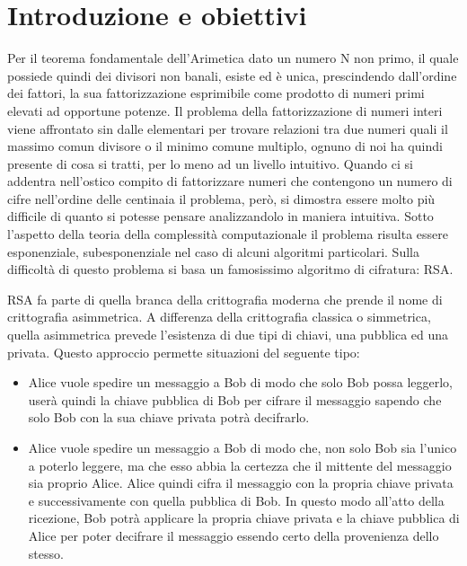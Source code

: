 \section{Introduzione e obiettivi}
\label{sec:introduzione}





Per il teorema fondamentale dell'Arimetica dato un numero N non primo, il quale possiede quindi dei divisori non banali, esiste ed è unica, prescindendo dall'ordine dei fattori, la sua fattorizzazione esprimibile come prodotto di numeri primi elevati ad opportune potenze.
Il problema della fattorizzazione di numeri interi viene affrontato sin dalle elementari per trovare relazioni tra due numeri quali il massimo comun divisore o il minimo comune multiplo, ognuno di noi ha quindi presente di cosa si tratti, per lo meno ad un livello intuitivo.
Quando ci si addentra nell'ostico compito di fattorizzare numeri che contengono un numero di cifre nell'ordine delle centinaia il problema, però, si dimostra essere molto più difficile di quanto si potesse pensare analizzandolo in maniera intuitiva.
Sotto l'aspetto della teoria della complessità computazionale il problema risulta essere esponenziale, subesponenziale nel caso di alcuni algoritmi particolari.
Sulla difficoltà di questo problema si basa un famosissimo algoritmo di cifratura: RSA.

RSA fa parte di quella branca della crittografia moderna che prende il nome di crittografia asimmetrica.
A differenza della crittografia classica o simmetrica, quella asimmetrica prevede l'esistenza di due tipi di chiavi, una pubblica ed una privata.
Questo approccio permette situazioni del seguente tipo:
\begin{itemize}


\item Alice vuole spedire un messaggio a Bob di modo che solo Bob possa leggerlo, userà quindi la chiave pubblica di Bob per cifrare il messaggio sapendo che solo Bob con la sua chiave privata potrà decifrarlo.

\item Alice vuole spedire un messaggio a Bob di modo che, non solo Bob sia l'unico a poterlo leggere, ma che esso abbia la certezza che il mittente del messaggio sia proprio Alice.
Alice quindi cifra il messaggio con la propria chiave privata e successivamente con quella pubblica di Bob. In questo modo all'atto della ricezione, Bob potrà applicare la propria chiave privata e la chiave pubblica di Alice per poter decifrare il messaggio essendo certo della provenienza dello stesso.

\end{itemize}

